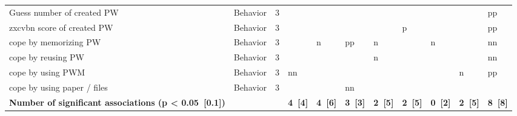 \begin{table}[htbp]
{\begin{tabular}{lrrrrrrrrrr}
 Guess number of created PW & \multicolumn{1}{l}{Behavior} & \multicolumn{1}{r|}{3} &       &       &       &       & \multicolumn{1}{r|}{} &       &       & \multicolumn{1}{l}{\cellcolor[rgb]{ 0,  .729,  .22} \textcolor[rgb]{ 1,  1,  1}{pp}} \\
 zxcvbn score of created PW & \multicolumn{1}{l}{Behavior} & \multicolumn{1}{r|}{3} &       &       &       &       & \multicolumn{1}{l|}{\cellcolor[rgb]{ .486,  .682,  0} \textcolor[rgb]{ 1,  1,  1}{p}} &       &       & \multicolumn{1}{l}{\cellcolor[rgb]{ 0,  .729,  .22} \textcolor[rgb]{ 1,  1,  1}{pp}} \\
 cope by memorizing PW & \multicolumn{1}{l}{Behavior} & \multicolumn{1}{r|}{3} &       & \multicolumn{1}{l}{\cellcolor[rgb]{ .871,  .549,  0} \textcolor[rgb]{ 1,  1,  1}{n}} & \multicolumn{1}{l}{\cellcolor[rgb]{ 0,  .729,  .22} \textcolor[rgb]{ 1,  1,  1}{pp}} & \multicolumn{1}{l}{\cellcolor[rgb]{ .871,  .549,  0} \textcolor[rgb]{ 1,  1,  1}{n}} & \multicolumn{1}{r|}{} & \multicolumn{1}{l}{\cellcolor[rgb]{ .871,  .549,  0} \textcolor[rgb]{ 1,  1,  1}{n}} &       & \multicolumn{1}{l}{\cellcolor[rgb]{ .973,  .463,  .427} \textcolor[rgb]{ 1,  1,  1}{nn}} \\
 cope by reusing PW & \multicolumn{1}{l}{Behavior} & \multicolumn{1}{r|}{3} &       &       &       & \multicolumn{1}{l}{\cellcolor[rgb]{ .871,  .549,  0} \textcolor[rgb]{ 1,  1,  1}{n}} & \multicolumn{1}{r|}{} &       &       & \multicolumn{1}{l}{\cellcolor[rgb]{ .973,  .463,  .427} \textcolor[rgb]{ 1,  1,  1}{nn}} \\
 cope by using PWM & \multicolumn{1}{l}{Behavior} & \multicolumn{1}{r|}{3} & \multicolumn{1}{l}{\cellcolor[rgb]{ .973,  .463,  .427} \textcolor[rgb]{ 1,  1,  1}{nn}} &       &       &       & \multicolumn{1}{r|}{} &       & \multicolumn{1}{l}{\cellcolor[rgb]{ .871,  .549,  0} \textcolor[rgb]{ 1,  1,  1}{n}} & \multicolumn{1}{l}{\cellcolor[rgb]{ 0,  .729,  .22} \textcolor[rgb]{ 1,  1,  1}{pp}} \\
 cope by using paper / files & \multicolumn{1}{l}{Behavior} & \multicolumn{1}{r|}{3} &       &       & \multicolumn{1}{l}{\cellcolor[rgb]{ .973,  .463,  .427} \textcolor[rgb]{ 1,  1,  1}{nn}} &       & \multicolumn{1}{r|}{} &       &       &  \\
 \midrule
 \midrule
 \textbf{Number of significant associations (p < 0.05~[0.1])} &       &       & \textbf{4~[4]} & \textbf{4~[6]} & \textbf{3~[3]} & \textbf{2~[5]} & \textbf{2~[5]} & \textbf{0~[2]} & \textbf{2~[5]} & \textbf{8~[8]} \\
 \end{tabular}%
}

\end{table}%
